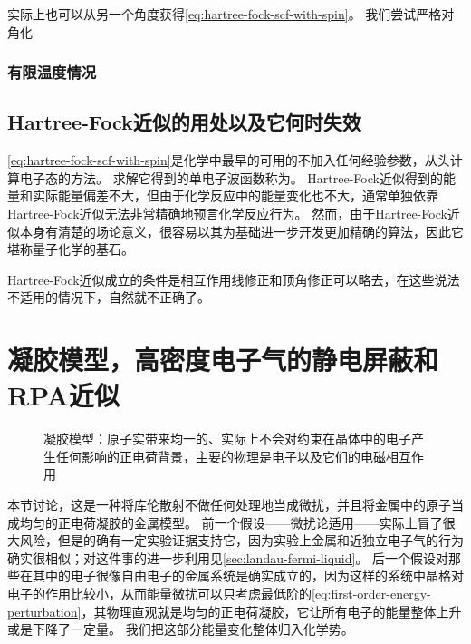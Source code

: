 
实际上也可以从另一个角度获得\eqref{eq:hartree-fock-scf-with-spin}。
我们尝试严格对角化


\subsubsection{有限温度情况}

\subsection{Hartree-Fock近似的用处以及它何时失效}

\eqref{eq:hartree-fock-scf-with-spin}是化学中最早的可用的不加入任何经验参数，从头计算电子态的方法。
求解它得到的单电子波函数称为。
Hartree-Fock近似得到的能量和实际能量偏差不大，但由于化学反应中的能量变化也不大，通常单独依靠Hartree-Fock近似无法非常精确地预言化学反应行为。
然而，由于Hartree-Fock近似本身有清楚的场论意义，很容易以其为基础进一步开发更加精确的算法，因此它堪称量子化学的基石。

Hartree-Fock近似成立的条件是相互作用线修正和顶角修正可以略去，在这些说法不适用的情况下，自然就不正确了。


\section{凝胶模型，高密度电子气的静电屏蔽和RPA近似}

\begin{figure}
    \centering
    
    \caption{凝胶模型：原子实带来均一的、实际上不会对约束在晶体中的电子产生任何影响的正电荷背景，主要的物理是电子以及它们的电磁相互作用}
\end{figure}

本节讨论，这是一种将库伦散射不做任何处理地当成微扰，并且将金属中的原子当成均匀的正电荷凝胶的金属模型。
前一个假设——微扰论适用——实际上冒了很大风险，但是的确有一定实验证据支持它，因为实验上金属和近独立电子气的行为确实很相似；对这件事的进一步利用见\autoref{sec:landau-fermi-liquid}。
后一个假设对那些在其中的电子很像自由电子的金属系统是确实成立的，因为这样的系统中晶格对电子的作用比较小，从而能量微扰可以只考虑最低阶的\eqref{eq:first-order-energy-perturbation}，其物理直观就是均匀的正电荷凝胶，它让所有电子的能量整体上升或是下降了一定量。
我们把这部分能量变化整体归入化学势。

